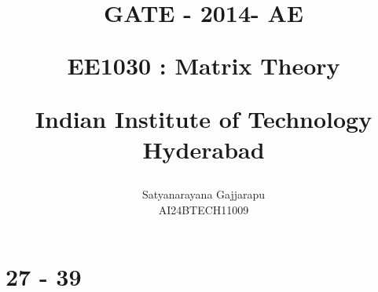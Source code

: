 \documentclass[journal]{IEEEtran}
\begin{document}

\vspace{3cm}




\title{
GATE - 2014- AE

\large{EE1030 : Matrix Theory}

Indian Institute of Technology Hyderabad
}
\author{Satyanarayana Gajjarapu

AI24BTECH11009
}	





\maketitle




\bigskip

\renewcommand{\thefigure}{\theenumi}
\renewcommand{\thetable}{\theenumi}


\section{27 - 39}
\end{document}
